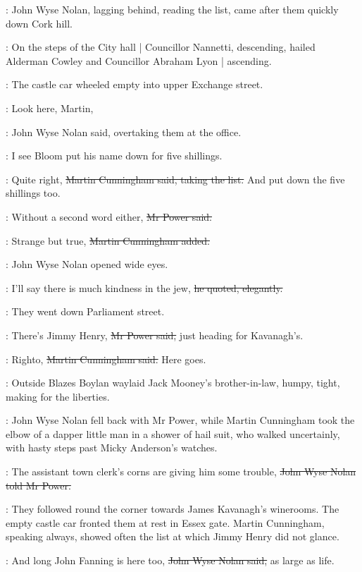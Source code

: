 :
John Wyse Nolan,
lagging behind, reading the list,
came after them
quickly down Cork hill.

:
On the steps of the City hall |
Councillor Nannetti, descending,
hailed Alderman Cowley and Councillor Abraham Lyon |
ascending.

:
The castle car wheeled empty into upper Exchange street.

\johnwyse:
Look here, Martin,

:
John Wyse Nolan said,
overtaking them at the  office.

\johnwyse:
I see Bloom put his name down for five shillings.

\cunningham:
Quite right,
\sout{Martin Cunningham said,
taking the list.}
And put down the
five shillings too.

\power:
Without a second word either,
\sout{Mr Power said.}

\cunningham:
Strange but true,
\sout{Martin Cunningham added.}

:
John Wyse Nolan opened wide eyes.

\johnwyse:
I'll say there is much kindness in the jew,
\sout{he quoted, elegantly.}

:
They went down Parliament street.

\power:
There's Jimmy Henry,
\sout{Mr Power said,}
just heading for Kavanagh's.

\cunningham:
Righto,
\sout{Martin Cunningham said.}
Here goes.

\begin{mdframed}
    :
    Outside 
    Blazes Boylan waylaid Jack Mooney's brother-in-law,
    humpy, tight,
    making for the liberties.
\end{mdframed}

:
John Wyse Nolan fell back with Mr Power,
while Martin Cunningham took the elbow
of a dapper little man in a shower of hail suit,
who walked uncertainly,
with hasty steps past Micky Anderson's watches.

\johnwyse:
The assistant town clerk's corns are giving him some trouble,
\sout{John Wyse Nolan told Mr Power.}%

:
They followed round the corner
towards James Kavanagh's winerooms.
The empty castle car fronted them at rest in Essex gate.
Martin Cunningham,
speaking always,
showed often the list at which Jimmy Henry did not glance.

\johnwyse:
And long John Fanning is here too,
\sout{John Wyse Nolan said,}
as large as life.

